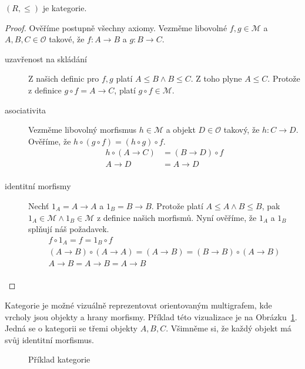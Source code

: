 \begin{statement*}
  $(R, \leq)$ je kategorie.
\end{statement*}
\begin{proof}
  Ověříme postupně všechny axiomy.
  Vezměme libovolné $f,g\in\mathcal M$ a $A,B,C\in\mathcal O$ takové, že $f\colon A\to B$ a $g\colon B\to C$.
  \begin{description}
    \item[uzavřenost na skládání] Z našich definic pro $f,g$ platí $A\leq B\land B\leq C$.
      Z toho plyne $A\leq C$.
      Protože z definice $g\circ f = A\to C$, platí $g\circ f\in\mathcal M$.
    \item[asociativita] Vezměme libovolný morfismus $h\in\mathcal M$ a objekt $D\in\mathcal O$ takový, že $h\colon C\to D$.
      Ověříme, že $h\circ (g\circ f) = (h\circ g)\circ f$.
      \begin{align*}
        h\circ (A\to C) & = (B\to D) \circ f \\
        A\to D          & = A\to D           \\
      \end{align*}
    \item[identitní morfismy] Nechť $1_A =A\to A$ a $1_B = B\to B$.
      Protože platí $A\leq A\land B\leq B$, pak $1_A\in \mathcal M\land 1_B\in\mathcal M$ z definice našich morfismů.
      Nyní ověříme, že $1_A$ a $1_B$ splňují náš požadavek.
      \begin{gather*}
        f\circ 1_A = f = 1_B\circ f \\
        (A\to B)\circ (A\to A) = (A\to B) = (B\to B)\circ (A\to B) \\
        A\to B = A\to B = A\to B \\
      \end{gather*}
  \end{description}
\end{proof}

Kategorie je možné vizuálně reprezentovat orientovaným multigrafem, kde vrcholy jsou objekty a hrany morfismy.
Příklad této vizualizace je na Obrázku~\ref{fig:category-example}.
Jedná se o kategorii se třemi objekty $A, B, C$.
Všimněme si, že každý objekt má svůj identitní morfismus.

\begin{figure}[!htb]
  \centering
  \caption{Příklad kategorie}%
  \label{fig:category-example}%
\end{figure}

